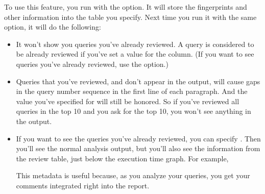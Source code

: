 \documentclass[letterpaper,10pt,english]{sphinxmanual}
\begin{document}
To use this feature, you run  with the {\hyperref[\detokenize{mariadb-query-digest:cmdoption-mariadb-query-digest-review}]{}} option.  It
will store the fingerprints and other information into the table you specify.
Next time you run it with the same option, it will do the following:
\begin{itemize}
\item {} 
It won’t show you queries you’ve already reviewed.  A query is considered to be
already reviewed if you’ve set a value for the  column.  (If you
want to see queries you’ve already reviewed, use the {\hyperref[\detokenize{mariadb-query-digest:cmdoption-mariadb-query-digest-report-all}]{}} option.)

\item {} 
Queries that you’ve reviewed, and don’t appear in the output, will cause gaps in
the query number sequence in the first line of each paragraph.  And the value
you’ve specified for {\hyperref[\detokenize{mariadb-query-digest:cmdoption-mariadb-query-digest-limit}]{}} will still be honored.  So if you’ve reviewed all
queries in the top 10 and you ask for the top 10, you won’t see anything in the
output.

\item {} 
If you want to see the queries you’ve already reviewed, you can specify
{\hyperref[\detokenize{mariadb-query-digest:cmdoption-mariadb-query-digest-report-all}]{}}.  Then you’ll see the normal analysis output, but you’ll
also see the information from the review table, just below the execution time
graph.  For example,

\begin{sphinxVerbatim}[commandchars=\\\{\}]
\end{sphinxVerbatim}

This metadata is useful because, as you analyze your queries, you get
your comments integrated right into the report.

\end{itemize}
\end{document}
